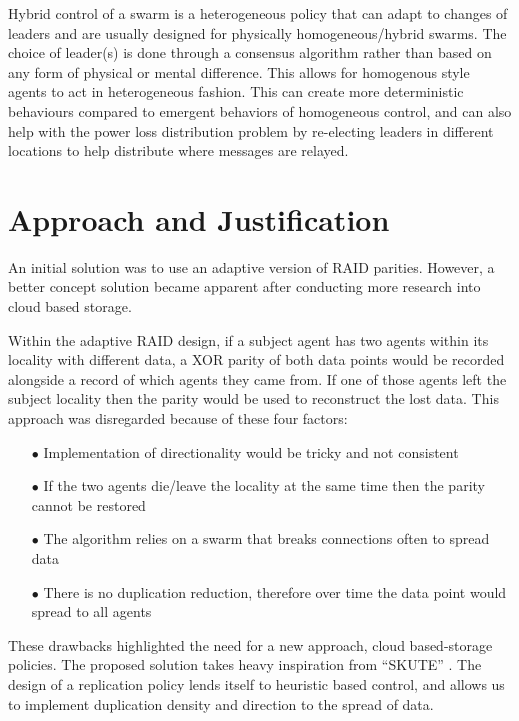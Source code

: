 \documentclass{UoYCSproject}
\begin{document}
Hybrid control of a swarm is a heterogeneous policy that can adapt to changes of leaders and are usually designed for physically homogeneous/hybrid swarms.
The choice of leader(s) is done through a consensus algorithm \cite{Paxos} rather than based on any form of physical or mental difference.
This allows for homogenous style agents to act in heterogeneous fashion.
This can create more deterministic behaviours compared to emergent behaviors of homogeneous control, and can also help with the power loss distribution problem by re-electing leaders in different locations to help distribute where messages are relayed.

\section{Approach and Justification}
\label{sec:Inital Soloution Ideas}

An initial solution was to use an adaptive version of RAID parities. However, a better concept solution became apparent after conducting more research into cloud based storage.

Within the adaptive RAID design, if a subject agent has two agents within its locality with different data, a XOR parity of both data points would be recorded alongside a record of which agents they came from. If one of those agents left the subject locality then the parity would be used to reconstruct the lost data. This approach was disregarded because of these four factors:

\begin{itemize}
\itemsep-1em
\item[$\bullet$] Implementation of directionality would be tricky and not consistent
\item[$\bullet$] If the two agents die/leave the locality at the same time then the parity cannot be restored
\item[$\bullet$] The algorithm relies on a swarm that breaks connections often to spread data
\item[$\bullet$] There is no duplication reduction, therefore over time the data point would spread to all agents
\end{itemize}

These drawbacks highlighted the need for a new approach, cloud based-storage policies. The proposed solution takes heavy inspiration from “SKUTE” \cite{Distributed Storage}. The design of a replication policy lends itself to heuristic based control, and allows us to implement duplication density and direction to the spread of data.
\end{document}
